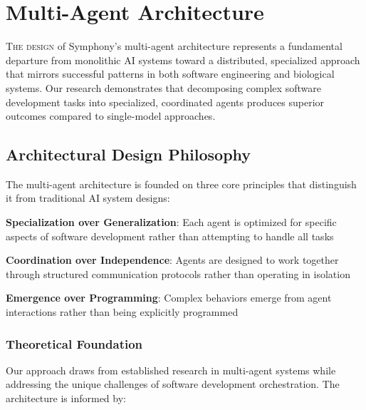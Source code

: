 
\section*{Multi-Agent Architecture}

\lettrine{T}{he design} of Symphony's multi-agent architecture represents a fundamental departure from monolithic AI systems toward a distributed, specialized approach that mirrors successful patterns in both software engineering and biological systems. Our research demonstrates that decomposing complex software development tasks into specialized, coordinated agents produces superior outcomes compared to single-model approaches.

\subsection*{Architectural Design Philosophy}

The multi-agent architecture is founded on three core principles that distinguish it from traditional AI system designs:

\begin{expandedlist}
    \item \textbf{Specialization over Generalization}: Each agent is optimized for specific aspects of software development rather than attempting to handle all tasks
    \item \textbf{Coordination over Independence}: Agents are designed to work together through structured communication protocols rather than operating in isolation
    \item \textbf{Emergence over Programming}: Complex behaviors emerge from agent interactions rather than being explicitly programmed
\end{expandedlist}

\subsubsection*{Theoretical Foundation}

Our approach draws from established research in multi-agent systems while addressing the unique challenges of software development orchestration. The architecture is informed by:

